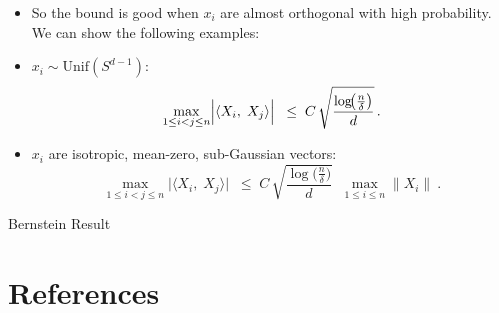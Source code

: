 \documentclass[serif, aspectratio=169]{beamer}
\begin{document}
\begin{frame}
	\begin{itemize}

	\item So the bound is good when \(x_i\) are almost orthogonal with high probability. We can show the following examples:
	
	\item \(x_i \sim \text{Unif}(S^{d-1})\):
	\[
	\max_{1 \le i < j \le n}
	\Bigl|\langle X_i,\;X_j\rangle\Bigr|
	\;\;\le\;
	C\,
	\sqrt{\frac{\log\!\bigl(\tfrac{n}{\delta}\bigr)}{d}}
	\,.
	\]
	
	\item \(x_i\) are isotropic, mean-zero, sub-Gaussian vectors:
	\[
	\max_{1 \le i < j \le n}
	\bigl|\langle X_i,\;X_j\rangle\bigr|
	\;\;\le\;
	C\,
	\sqrt{\frac{\log\!\bigl(\tfrac{n}{\delta}\bigr)}{d}}
	\;\;\max_{1\le i\le n}\|X_i\|\ .
	\]
	\end{itemize}
	
\end{frame}


\begin{frame}
	 Bernstein Result
\end{frame}




%	



\section{References}
\end{document}

